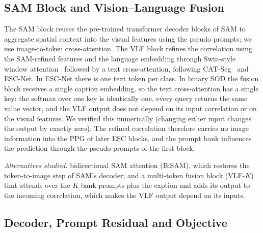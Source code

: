 \subsection{SAM Block and Vision--Language Fusion}
\label{sec:sam}

\begin{revpar}
The SAM block reuses the pre-trained transformer decoder blocks of SAM to
aggregate spatial context into the visual features using the pseudo prompts; we use
image-to-token cross-attention. The VLF block refines the correlation using the
SAM-refined features and the language embedding through Swin-style window
attention~\cite{liu2021swin} followed by a text cross-attention, following
CAT-Seg~\cite{cho2024cat} and ESC-Net. In ESC-Net there is one text token per
class. In binary SOD the fusion block receives a single caption embedding, so the
text cross-attention has a single key: the softmax over one key is identically one,
every query returns the same value vector, and the VLF output does not depend on
its input correlation or on the visual features. We verified this numerically
(changing either input changes the output by exactly zero). The refined
correlation therefore carries no image information into the PPG of later ESC
blocks, and the prompt bank influences the prediction through the pseudo prompts
of the first block.

\noindent\textit{Alternatives studied:} bidirectional SAM attention (BiSAM), which
restores the token-to-image step of SAM's decoder; and a multi-token fusion block
(VLF-$K$) that attends over the $K$ bank prompts plus the caption and adds its
output to the incoming correlation, which makes the VLF output depend on its
inputs.
\end{revpar}


\subsection{Decoder, Prompt Residual and Objective}
\label{sec:decoder}
\label{sec:residual}


